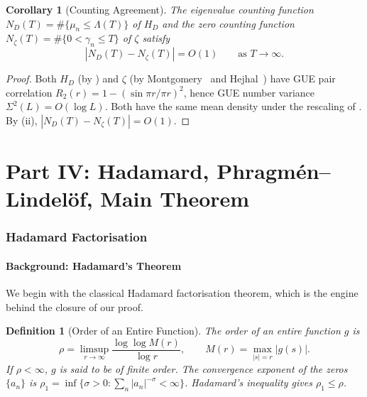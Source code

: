 \documentclass[11pt,a4paper]{article}
\theoremstyle{plain}
\newtheorem{corollary}[theorem]{Corollary}
\newtheorem{definition}[theorem]{Definition}
\theoremstyle{remark}
\begin{document}
\begin{corollary}[Counting Agreement]\label{cor:counting}
The eigenvalue counting function $N_D(T)=\#\{\mu_n\leq\Lambda(T)\}$ of
$H_D$ and the zero counting function $N_\zeta(T)=\#\{0<\gamma_n\leq T\}$
of $\zeta$ satisfy
\begin{equation}\label{eq:counting-agreement}
  |N_D(T)-N_\zeta(T)|=O(1)\qquad\text{as }T\to\infty.
\end{equation}
\end{corollary}

\begin{proof}
Both $H_D$ (by ) and $\zeta$
(by Montgomery~\cite{montgomery1973} and Hejhal~\cite{hejhal1994})
have GUE pair correlation $R_2(r)=1-(\sin\pi r/\pi r)^2$, hence
GUE number variance $\Sigma^2(L)=O(\log L)$.  Both have the same
mean density under the rescaling of .
By (ii), $|N_D(T)-N_\zeta(T)|=O(1)$.
\end{proof}



\part*{Part IV: Hadamard, Phragm\'en--Lindel\"of, Main Theorem}

\section{Hadamard Factorisation}\label{sec:hadamard}

\subsection{Background: Hadamard's Theorem}

We begin with the classical Hadamard factorisation theorem, which is the
engine behind the closure of our proof.

\begin{definition}[Order of an Entire Function]\label{def:order}
The \emph{order} of an entire function $g$ is
\[
  \rho=\limsup_{r\to\infty}\frac{\log\log M(r)}{\log r},
  \qquad M(r)=\max_{|s|=r}|g(s)|.
\]
If $\rho<\infty$, $g$ is said to be of \emph{finite order}.  The
\emph{convergence exponent} of the zeros $\{a_n\}$ is
$\rho_1=\inf\{\sigma>0:\sum_n|a_n|^{-\sigma}<\infty\}$.
Hadamard's inequality gives $\rho_1\leq\rho$.
\end{definition}
\end{document}
